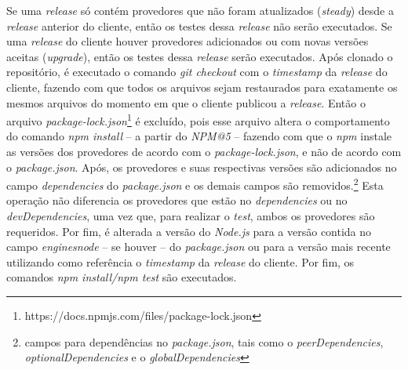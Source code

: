 Se uma \textit{release} só contém provedores que não foram atualizados (\textit{steady}) desde a \textit{release} anterior do cliente, então os testes dessa \textit{release} não serão executados. Se uma \textit{release} do cliente houver provedores adicionados ou com novas versões aceitas (\textit{upgrade}), então os testes dessa \textit{release} serão executados. Após clonado o repositório, é executado o comando \textit{git checkout} com o \textit{timestamp} da \textit{release} do cliente, fazendo com que todos os arquivos sejam restaurados para exatamente os mesmos arquivos do momento em que o cliente publicou a \textit{release}. Então o arquivo \textit{package-lock.json}\footnote{https://docs.npmjs.com/files/package-lock.json} é excluído, pois esse arquivo altera o comportamento do comando \textit{npm install} -- a partir do \textit{NPM@5} -- fazendo com que o \textit{npm} instale as versões dos provedores de acordo com o \textit{package-lock.json}, e não de acordo com o \textit{package.json}. Após, os provedores e suas respectivas versões são adicionados no campo \textit{dependencies} do \textit{package.json} e os demais campos são removidos.\footnote{campos para dependências no \textit{package.json}, tais como o \textit{peerDependencies}, \textit{optionalDependencies} e o \textit{globalDependencies}} Esta operação não diferencia os provedores que estão no \textit{dependencies} ou no \textit{devDependencies}, uma vez que, para realizar o \textit{test}, ambos os provedores são requeridos. Por fim, é alterada a versão do \textit{Node.js} para a versão contida no campo \textit{engines\textrightarrow node} -- se houver -- do \textit{package.json} ou para a versão mais recente utilizando como referência o \textit{timestamp} da \textit{release} do cliente. Por fim, os comandos \textit{npm install/npm test} são executados.


